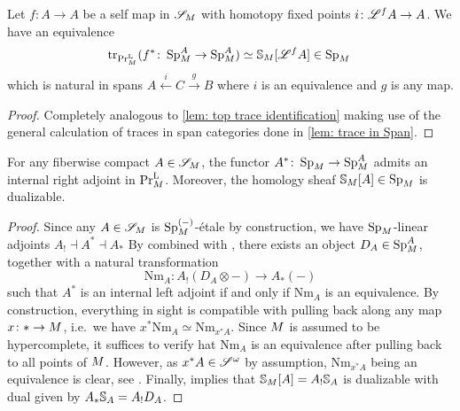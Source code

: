 
\begin{lem}\label{lem: homo trace identification}
    Let $f\colon A\to A$ be a self map in $\mathscr{S}_{M}$ with homotopy
    fixed points $i\colon \mathscr{L}^fA \to A$. We have an equivalence 
    \[ \tr{f^* \colon \pSp{\base}[A]\to \pSp{\base}[A]}{\pPrl{\base}}
    \simeq \SS_{\base}[\cL^fA] \in \pSp{\base}\,\]
   which is natural in spans $A\xleftarrow{i} C \xrightarrow{g} B$ where
   $i$ is an equivalence and $g$ is any map.
\end{lem}
\begin{proof}
    Completely analogous to \cref{lem: top trace identification} making
    use of the general calculation of traces in span categories done in \cref{lem: trace in Span}.
\end{proof}

\begin{lem}\label{lem: fiberwise cpt implies internal adjoint}
  For any fiberwise compact $A\in \mathscr{S}_{M}$, the functor 
  $A^*\colon \pSp{\base}\to \pSp{\base}[A]$ admits an internal right adjoint in 
  $\mathrm{Pr}^{\mathrm{L}}_{M}$. Moreover, the homology sheaf $\SS_{\base}[A]\in \pSp{\base}$ is dualizable.
\end{lem}
\begin{proof}
  Since any $A \in \mathscr{S}_{M}$ is $\pSp{\base}[(-)]$-\'etale by construction, we have
  $\pSp{\base}$-linear adjoints $A_! \dashv A^* \dashv A_*$ By \cite[Definition 3.3]{Cnossen2023}
  combined with \cite[Proposition 3.8]{Cnossen2023}, there exists an object $D_A\in \pSp{\base}[A]$,
  together with a natural transformation
  \[ \mathrm{Nm}_A\colon A_!(D_A \otimes -) \to A_*(-)\]
  such that $A^*$ is an internal left adjoint if and only if $\mathrm{Nm}_A$ is an equivalence.
  By construction, everything in sight is compatible with pulling back along any map 
  $x\colon \ast \to M$, i.e.~we have $x^*\mathrm{Nm}_A \simeq \mathrm{Nm}_{x^*A}$. 
  Since $M$ is assumed to be hypercomplete, it suffices to verify hat $\mathrm{Nm}_A$ 
  is an equivalence after pulling back to all points of $M$. However, as $x^*A \in \mathscr{S}^{\omega}$
  by assumption, $\mathrm{Nm}_{x^*A}$ being an equivalence is clear, see \cite[Example 3.12]{Cnossen2023}. 
  Finally, \cite[Corollary 3.40]{Cnossen2023} implies that $\mathbb{S}_{M}[A]=A_! \mathbb{S}_A$ is 
  dualizable with dual given by $A_*\mathbb{S}_A = A_!D_A$.
\end{proof}

